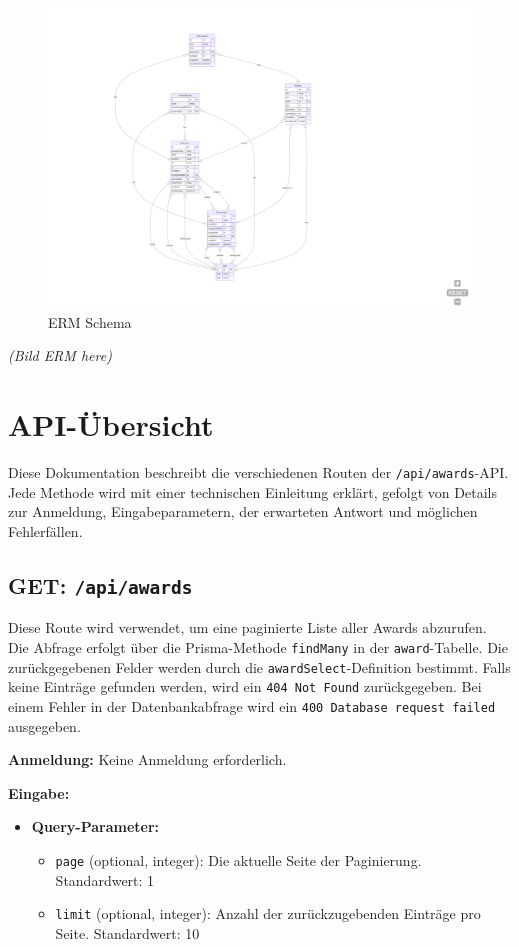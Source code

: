 \documentclass[a4paper,12pt]{article}
\begin{document}
\begin{figure}[p]
	\centering
	\includegraphics[scale=.5]{"ERM"}
	\caption{ERM Schema}
	\label{fig:ERM}
\end{figure}
\textit{(Bild ERM here)}

\newpage

\section{API-Übersicht}
Diese Dokumentation beschreibt die verschiedenen Routen der \texttt{/api/awards}-API. Jede Methode wird mit einer technischen Einleitung erklärt, gefolgt von Details zur Anmeldung, Eingabeparametern, der erwarteten Antwort und möglichen Fehlerfällen.

\subsection{GET: \texttt{/api/awards}}

Diese Route wird verwendet, um eine paginierte Liste aller Awards abzurufen. Die Abfrage erfolgt über die Prisma-Methode \texttt{findMany} in der \texttt{award}-Tabelle. Die zurückgegebenen Felder werden durch die \texttt{awardSelect}-Definition bestimmt. Falls keine Einträge gefunden werden, wird ein \texttt{404 Not Found} zurückgegeben. Bei einem Fehler in der Datenbankabfrage wird ein \texttt{400 Database request failed} ausgegeben.

\textbf{Anmeldung:} Keine Anmeldung erforderlich.

\textbf{Eingabe:}
\begin{itemize}
    \item \textbf{Query-Parameter:}
    \begin{itemize}
        \item \texttt{page} (optional, integer): Die aktuelle Seite der Paginierung. Standardwert: 1
        \item \texttt{limit} (optional, integer): Anzahl der zurückzugebenden Einträge pro Seite. Standardwert: 10
    \end{itemize}
\end{itemize}
\end{document}
